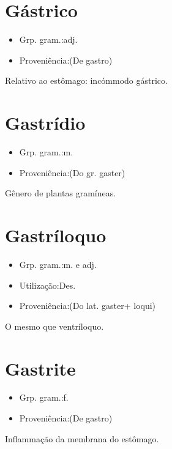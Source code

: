 \section{Gástrico}
\begin{itemize}
\item {Grp. gram.:adj.}
\end{itemize}
\begin{itemize}
\item {Proveniência:(De \textunderscore gastro\textunderscore )}
\end{itemize}
Relativo ao estômago: \textunderscore incómmodo gástrico\textunderscore .
\section{Gastrídio}
\begin{itemize}
\item {Grp. gram.:m.}
\end{itemize}
\begin{itemize}
\item {Proveniência:(Do gr. \textunderscore gaster\textunderscore )}
\end{itemize}
Gênero de plantas gramíneas.
\section{Gastríloquo}
\begin{itemize}
\item {Grp. gram.:m.  e  adj.}
\end{itemize}
\begin{itemize}
\item {Utilização:Des.}
\end{itemize}
\begin{itemize}
\item {Proveniência:(Do lat. \textunderscore gaster\textunderscore  + \textunderscore loqui\textunderscore )}
\end{itemize}
O mesmo que \textunderscore ventríloquo\textunderscore .
\section{Gastrite}
\begin{itemize}
\item {Grp. gram.:f.}
\end{itemize}
\begin{itemize}
\item {Proveniência:(De \textunderscore gastro\textunderscore )}
\end{itemize}
Inflammação da membrana do estômago.
